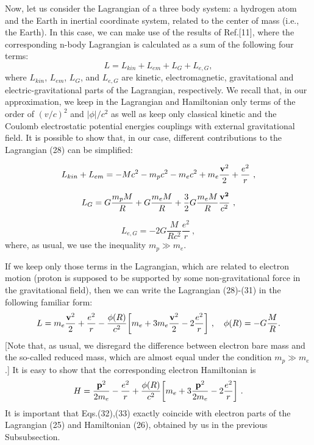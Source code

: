 \documentclass{ws-ijmpd}
\begin{document}
Now, let us consider the Lagrangian of a three body system: a
hydrogen atom and the Earth in inertial coordinate system, related
to the center of mass (i.e., the Earth). In this case, we can make
use of the results of Ref.[11], where the corresponding n-body
Lagrangian is calculated as a sum of the following four terms:
\begin{equation}
L = L_{kin} + L_{em} + L_{G} + L_{e,G},
\end{equation}
where $L_{kin}$, $L_{em}$, $L_G$, and $L_{e,G}$ are kinetic,
electromagnetic, gravitational and electric-gravitational parts of
the Lagrangian, respectively. We recall that, in our
approximation, we keep in the Lagrangian and Hamiltonian only
terms of the order of $(v/c)^2$ and $|\phi|/c^2$ as well as keep
only classical kinetic and the Coulomb electrostatic potential energies
couplings with external gravitational field. It is possible to
show that, in our case, different contributions to the Lagrangian
(28) can be simplified:

\begin{equation}
L_{kin} + L_{em} = - Mc^2 - m_pc^2 - m_ec^2 +
m_e\frac{{\bf v}^2}{2} + \frac{e^2}{r} \ ,
\end{equation}


\begin{equation}
L_{G} = G \frac{m_p M}{R} + G \frac{m_e M}{R} + \frac{3}{2} G
\frac{m_e M}{R} \frac{{\bf v^2}}{c^2} \ ,
\end{equation}

\begin{equation}
L_{e,G} = - 2 G \frac{M}{Rc^2} \frac{e^2}{r} \ ,
\end{equation}
where, as usual, we use the inequality $m_p \gg m_e$.

If we keep only those terms in the Lagrangian, which are related
to electron motion (proton is supposed to be supported by some
non-gravitational force in the gravitational field), then we can
write the Lagrangian (28)-(31) in the following familiar form:
\begin{equation}
L = m_e \frac{{\bf v}^2}{2} + \frac{e^2}{r} - \frac{\phi(R)}{c^2}
\biggl[ m_e + 3 m_e \frac{{\bf v}^2}{2} - 2 \frac{e^2}{r} \biggl]
\ , \ \ \ \phi(R) = - G \frac{M}{R}.
\end{equation}
[Note that, as usual, we disregard the difference between electron
bare mass and the so-called reduced mass, which are almost equal
under the condition $m_p \gg m_e$.] It is easy to show that the
corresponding electron Hamiltonian is
\begin{equation}
H= \frac{{\bf p}^2}{2m_e} -\frac{e^2}{r} + \frac{\phi(R)}{c^2}
\biggl[ m_e + 3 \frac{{\bf p}^2}{2m_e} - 2 \frac{e^2}{r} \biggl] \ .
\end{equation}
It is important that Eqs.(32),(33) exactly coincide with electron
parts of the Lagrangian (25) and Hamiltonian (26), obtained by us
in the previous Subsubsection.
\end{document}
